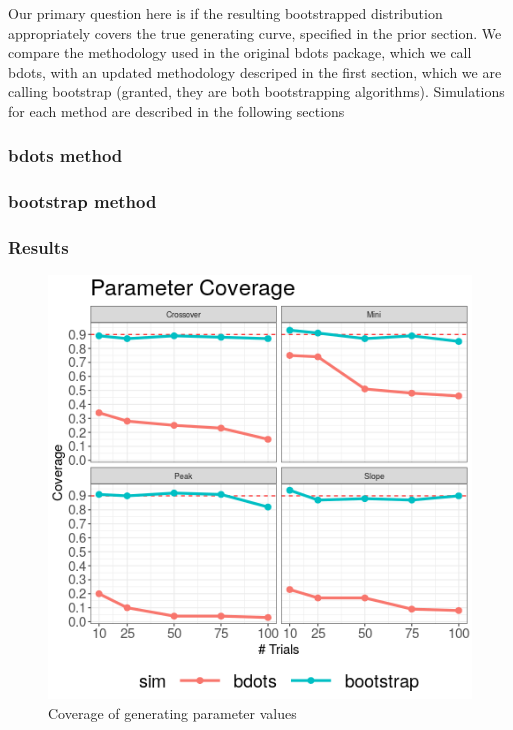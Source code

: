 \documentclass{article}
\begin{document}
Our primary question here is if the resulting bootstrapped distribution appropriately covers the true generating curve, specified in the prior section. We compare the methodology used in the original bdots package, which we call bdots, with an updated methodology descriped in the first section, which we are calling bootstrap (granted, they are both bootstrapping algorithms). Simulations for each method are described in the following sections

\subsubsection{bdots method}

\subsubsection{bootstrap method}

\subsubsection{Results}

\begin{figure}[h!]
\centering
\includegraphics[scale=0.65]{img/par_coverage.png}
\caption{Coverage of generating parameter values}
\end{figure}
\end{document}
